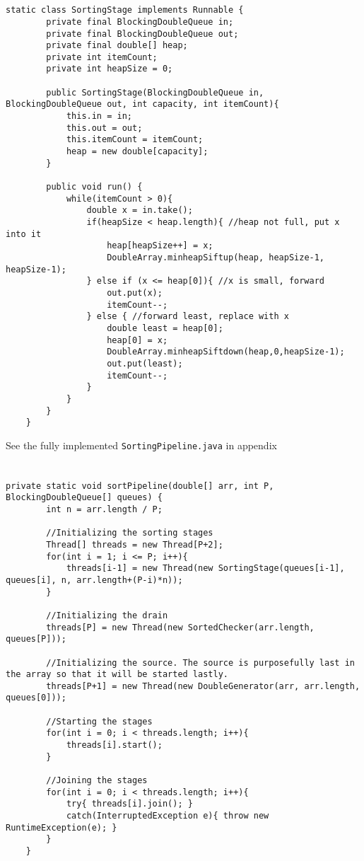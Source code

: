 \documentclass{ituhandin}
\begin{document}
\section{}
\begin{lstlisting}[caption=Implemented code for the Sorting stage]
    static class SortingStage implements Runnable {
        private final BlockingDoubleQueue in;
        private final BlockingDoubleQueue out;
        private final double[] heap; 
        private int itemCount;
        private int heapSize = 0;

        public SortingStage(BlockingDoubleQueue in, BlockingDoubleQueue out, int capacity, int itemCount){
            this.in = in;
            this.out = out;
            this.itemCount = itemCount;
            heap = new double[capacity];
        }

        public void run() { 
            while(itemCount > 0){
                double x = in.take();
                if(heapSize < heap.length){ //heap not full, put x into it
                    heap[heapSize++] = x;
                    DoubleArray.minheapSiftup(heap, heapSize-1, heapSize-1);
                } else if (x <= heap[0]){ //x is small, forward
                    out.put(x);
                    itemCount--;
                } else { //forward least, replace with x
                    double least = heap[0];
                    heap[0] = x;
                    DoubleArray.minheapSiftdown(heap,0,heapSize-1);
                    out.put(least);
                    itemCount--;
                }
            }
        }
    }
\end{lstlisting}
See the fully implemented \texttt{SortingPipeline.java} in appendix 
\newpage
\section{}
\begin{lstlisting}[caption=Implemented code for setting up and starting stages]
    private static void sortPipeline(double[] arr, int P, BlockingDoubleQueue[] queues) {
        int n = arr.length / P;

        //Initializing the sorting stages
        Thread[] threads = new Thread[P+2];
        for(int i = 1; i <= P; i++){
            threads[i-1] = new Thread(new SortingStage(queues[i-1], queues[i], n, arr.length+(P-i)*n)); 
        }

        //Initializing the drain
        threads[P] = new Thread(new SortedChecker(arr.length, queues[P]));

        //Initializing the source. The source is purposefully last in the array so that it will be started lastly.
        threads[P+1] = new Thread(new DoubleGenerator(arr, arr.length, queues[0]));

        //Starting the stages
        for(int i = 0; i < threads.length; i++){
            threads[i].start();
        }

        //Joining the stages
        for(int i = 0; i < threads.length; i++){
            try{ threads[i].join(); }
            catch(InterruptedException e){ throw new RuntimeException(e); }
        }
    }
\end{lstlisting}
\end{document}
